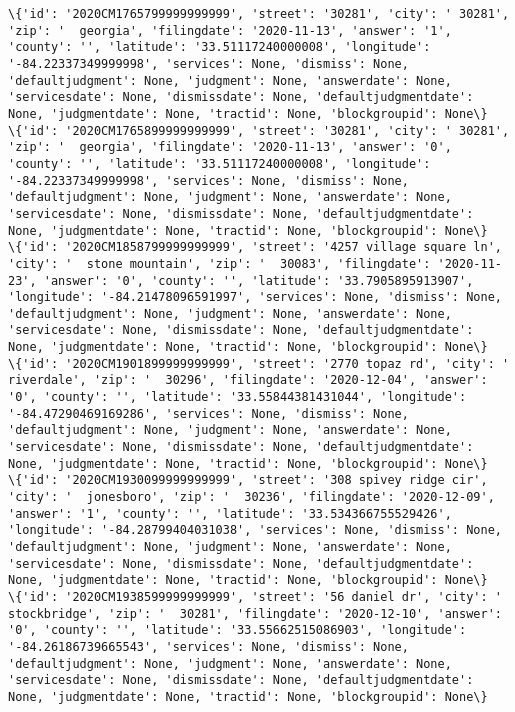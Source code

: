 \documentclass[11pt]{article}
\begin{document}
\begin{Verbatim}[commandchars=\\\{\}]
\{'id': '2020CM1765799999999999', 'street': '30281', 'city': ' 30281', 'zip': '  georgia', 'filingdate': '2020-11-13', 'answer': '1', 'county': '', 'latitude': '33.51117240000008', 'longitude': '-84.22337349999998', 'services': None, 'dismiss': None, 'defaultjudgment': None, 'judgment': None, 'answerdate': None, 'servicesdate': None, 'dismissdate': None, 'defaultjudgmentdate': None, 'judgmentdate': None, 'tractid': None, 'blockgroupid': None\}
\{'id': '2020CM1765899999999999', 'street': '30281', 'city': ' 30281', 'zip': '  georgia', 'filingdate': '2020-11-13', 'answer': '0', 'county': '', 'latitude': '33.51117240000008', 'longitude': '-84.22337349999998', 'services': None, 'dismiss': None, 'defaultjudgment': None, 'judgment': None, 'answerdate': None, 'servicesdate': None, 'dismissdate': None, 'defaultjudgmentdate': None, 'judgmentdate': None, 'tractid': None, 'blockgroupid': None\}
\{'id': '2020CM1858799999999999', 'street': '4257 village square ln', 'city': '  stone mountain', 'zip': '  30083', 'filingdate': '2020-11-23', 'answer': '0', 'county': '', 'latitude': '33.7905895913907', 'longitude': '-84.21478096591997', 'services': None, 'dismiss': None, 'defaultjudgment': None, 'judgment': None, 'answerdate': None, 'servicesdate': None, 'dismissdate': None, 'defaultjudgmentdate': None, 'judgmentdate': None, 'tractid': None, 'blockgroupid': None\}
\{'id': '2020CM1901899999999999', 'street': '2770 topaz rd', 'city': '  riverdale', 'zip': '  30296', 'filingdate': '2020-12-04', 'answer': '0', 'county': '', 'latitude': '33.55844381431044', 'longitude': '-84.47290469169286', 'services': None, 'dismiss': None, 'defaultjudgment': None, 'judgment': None, 'answerdate': None, 'servicesdate': None, 'dismissdate': None, 'defaultjudgmentdate': None, 'judgmentdate': None, 'tractid': None, 'blockgroupid': None\}
\{'id': '2020CM1930099999999999', 'street': '308 spivey ridge cir', 'city': '  jonesboro', 'zip': '  30236', 'filingdate': '2020-12-09', 'answer': '1', 'county': '', 'latitude': '33.534366755529426', 'longitude': '-84.28799404031038', 'services': None, 'dismiss': None, 'defaultjudgment': None, 'judgment': None, 'answerdate': None, 'servicesdate': None, 'dismissdate': None, 'defaultjudgmentdate': None, 'judgmentdate': None, 'tractid': None, 'blockgroupid': None\}
\{'id': '2020CM1938599999999999', 'street': '56 daniel dr', 'city': '  stockbridge', 'zip': '  30281', 'filingdate': '2020-12-10', 'answer': '0', 'county': '', 'latitude': '33.55662515086903', 'longitude': '-84.26186739665543', 'services': None, 'dismiss': None, 'defaultjudgment': None, 'judgment': None, 'answerdate': None, 'servicesdate': None, 'dismissdate': None, 'defaultjudgmentdate': None, 'judgmentdate': None, 'tractid': None, 'blockgroupid': None\}

\end{Verbatim}
\end{document}
